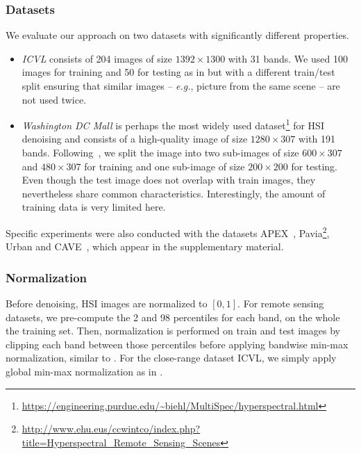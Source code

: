 \subsubsection{Datasets}

We evaluate our approach on two datasets with significantly different properties.
\begin{itemize}
   \item \textit{ICVL} \cite{arad_sparse_2016}  consists of 204 images of size $1392 \times 1300$ with 31 bands. 
   We used 100 images for training and 50 for testing as in \cite{wei_3-d_2020} but with a different train/test split ensuring that similar images -- \emph{e.g.}, picture from the same scene -- are not used twice.  
   \item \textit{Washington DC Mall} is perhaps the most widely used dataset\footnote{\url{https://engineering.purdue.edu/~biehl/MultiSpec/hyperspectral.html}} for HSI denoising and consists of a high-quality image of size $1280 \times 307$ with 191 bands.  
Following~\cite{shi_hyperspectral_2021}, we split the image into two sub-images of size $600 \times 307$ and $480 \times 307$ for training and one sub-image of size $200 \times 200$ for testing. 
Even though the test image does not overlap with train images, they nevertheless share common characteristics. 
Interestingly, the amount of training data is very limited here.
\end{itemize}

Specific experiments were also conducted with the datasets APEX~\cite{itten_apex-hyperspectral_2008}, Pavia\footnote{\url{http://www.ehu.eus/ccwintco/index.php?title=Hyperspectral_Remote_Sensing_Scenes}}, Urban\cite{rickard_hydice_1993} and CAVE~\cite{yasuma_generalized_2010}, which appear in the supplementary material.



\subsubsection{Normalization}

Before denoising, HSI images are normalized to $[0,1]$.
For remote sensing datasets, we pre-compute the 2 and 98 percentiles for each band, on the whole the training set.
Then, normalization is performed on train and test images by clipping each band between those percentiles before applying bandwise min-max normalization, similar to \cite{audebert_deep_2019, maffei_single_2020}.
For the close-range dataset ICVL, we simply apply global min-max normalization as in \cite{xiong_smds-net_2020, wei_3-d_2020}.

